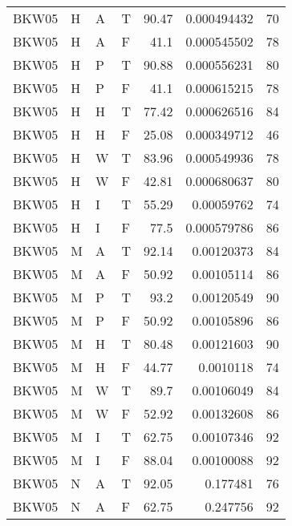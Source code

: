 \begin{longtable}{llllrrr}
    BKW05    & H     & A     & T          & 90.47      & 0.000494432 & 70       \\
    BKW05    & H     & A     & F          & 41.1       & 0.000545502 & 78       \\
    BKW05    & H     & P     & T          & 90.88      & 0.000556231 & 80       \\
    BKW05    & H     & P     & F          & 41.1       & 0.000615215 & 78       \\
    BKW05    & H     & H     & T          & 77.42      & 0.000626516 & 84       \\
    BKW05    & H     & H     & F          & 25.08      & 0.000349712 & 46       \\
    BKW05    & H     & W     & T          & 83.96      & 0.000549936 & 78       \\
    BKW05    & H     & W     & F          & 42.81      & 0.000680637 & 80       \\
    BKW05    & H     & I     & T          & 55.29      & 0.00059762  & 74       \\
    BKW05    & H     & I     & F          & 77.5       & 0.000579786 & 86       \\
    BKW05    & M     & A     & T          & 92.14      & 0.00120373  & 84       \\
    BKW05    & M     & A     & F          & 50.92      & 0.00105114  & 86       \\
    BKW05    & M     & P     & T          & 93.2       & 0.00120549  & 90       \\
    BKW05    & M     & P     & F          & 50.92      & 0.00105896  & 86       \\
    BKW05    & M     & H     & T          & 80.48      & 0.00121603  & 90       \\
    BKW05    & M     & H     & F          & 44.77      & 0.0010118   & 74       \\
    BKW05    & M     & W     & T          & 89.7       & 0.00106049  & 84       \\
    BKW05    & M     & W     & F          & 52.92      & 0.00132608  & 86       \\
    BKW05    & M     & I     & T          & 62.75      & 0.00107346  & 92       \\
    BKW05    & M     & I     & F          & 88.04      & 0.00100088  & 92       \\
    BKW05    & N     & A     & T          & 92.05      & 0.177481    & 76       \\
    BKW05    & N     & A     & F          & 62.75      & 0.247756    & 92       \\

\end{longtable}
